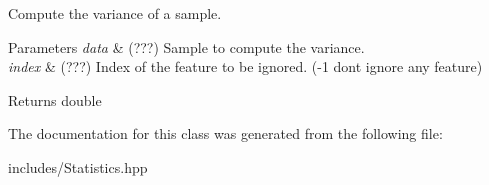 Compute the variance of a sample. 


\begin{DoxyParams}{Parameters}
{\em data} & (???) Sample to compute the variance. \\
\hline
{\em index} & (???) Index of the feature to be ignored. (-\/1 dont ignore any feature) \\
\hline
\end{DoxyParams}
\begin{DoxyReturn}{Returns}
double 
\end{DoxyReturn}


The documentation for this class was generated from the following file\+:\begin{DoxyCompactItemize}
\item 
includes/Statistics.\+hpp\end{DoxyCompactItemize}
